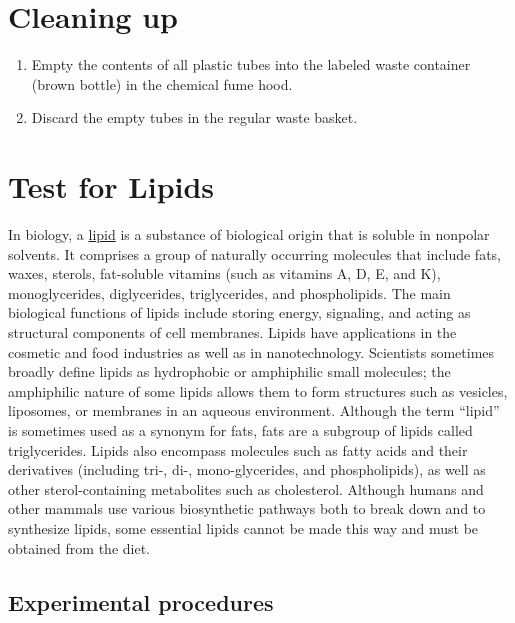 \section{Cleaning up}\label{cleaning-up}

\begin{enumerate}
\def\labelenumi{\arabic{enumi}.}
\tightlist
\item
  Empty the contents of all plastic tubes into the labeled waste
  container (brown bottle) in the chemical fume hood.
\item
  Discard the empty tubes in the regular waste basket.
\end{enumerate}

\section{Test for Lipids}\label{test-for-lipids}

In biology, a \href{https://en.wikipedia.org/wiki/Lipid}{lipid} is a
substance of biological origin that is soluble in nonpolar solvents. It
comprises a group of naturally occurring molecules that include fats,
waxes, sterols, fat-soluble vitamins (such as vitamins A, D, E, and K),
monoglycerides, diglycerides, triglycerides, and phospholipids. The main
biological functions of lipids include storing energy, signaling, and
acting as structural components of cell membranes. Lipids have
applications in the cosmetic and food industries as well as in
nanotechnology. Scientists sometimes broadly define lipids as
hydrophobic or amphiphilic small molecules; the amphiphilic nature of
some lipids allows them to form structures such as vesicles, liposomes,
or membranes in an aqueous environment. Although the term ``lipid'' is
sometimes used as a synonym for fats, fats are a subgroup of lipids
called triglycerides. Lipids also encompass molecules such as fatty
acids and their derivatives (including tri-, di-, mono-glycerides, and
phospholipids), as well as other sterol-containing metabolites such as
cholesterol. Although humans and other mammals use various biosynthetic
pathways both to break down and to synthesize lipids, some essential
lipids cannot be made this way and must be obtained from the diet.

\subsection{Experimental procedures}\label{experimental-procedures-4}

